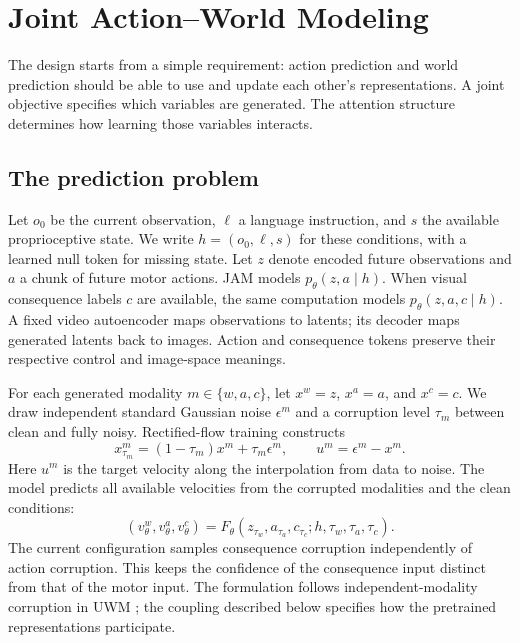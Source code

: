 \section{Joint Action--World Modeling}
\label{sec:method}
The design starts from a simple requirement: action prediction and world prediction should be able
to use and update each other's representations. A joint objective specifies which variables are
generated. The attention structure determines how learning those variables interacts.

\subsection{The prediction problem}
Let $o_0$ be the current observation, $\ell$ a language instruction, and $s$ the available
proprioceptive state. We write $h=(o_0,\ell,s)$ for these conditions, with a learned null token for
missing state. Let $z$ denote encoded future observations and $a$ a chunk of future motor actions.
JAM models $p_\theta(z,a\mid h)$. When visual consequence labels $c$ are available, the same
computation models $p_\theta(z,a,c\mid h)$. A fixed video autoencoder maps observations to latents;
its decoder maps generated latents back to images. Action and consequence tokens preserve their
respective control and image-space meanings.

For each generated modality $m\in\{w,a,c\}$, let $x^w=z$, $x^a=a$, and $x^c=c$. We draw independent
standard Gaussian noise $\epsilon^m$ and a corruption level $\tau_m$ between clean and fully noisy.
Rectified-flow training constructs
\begin{equation}
 x^m_{\tau_m}=(1-\tau_m)x^m+\tau_m\epsilon^m,
 \qquad u^m=\epsilon^m-x^m.
 \label{eq:flow}
\end{equation}
Here $u^m$ is the target velocity along the interpolation from data to noise. The model predicts all
available velocities from the corrupted modalities and the clean conditions:
\begin{equation}
 (v^w_\theta,v^a_\theta,v^c_\theta)
 =F_\theta(z_{\tau_w},a_{\tau_a},c_{\tau_c};h,\tau_w,\tau_a,\tau_c).
 \label{eq:prediction}
\end{equation}
The current configuration samples consequence corruption independently of action corruption. This
keeps the confidence of the consequence input distinct from that of the motor input. The formulation
follows independent-modality corruption in UWM \citep{uwm}; the coupling described below specifies
how the pretrained representations participate.

